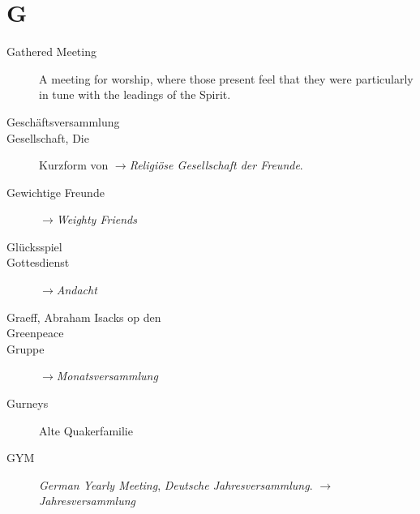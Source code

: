\section*{G}

\articlesize

\begin{description}

\item[Gathered Meeting]
    A meeting for worship, where those present feel that they were particularly in tune with the leadings of the Spirit.

 \item[Geschäftsversammlung]

 \item[Gesellschaft, Die] Kurzform von $\to$\textit{Religiöse Gesellschaft der Freunde}.

\item[Gewichtige Freunde] $\to$\textit{Weighty Friends}

\item[Glücksspiel]

\item[Gottesdienst] $\to$\textit{Andacht}

 \item[Graeff, Abraham Isacks op den]

 \item[Greenpeace]

\item[Gruppe] $\to$\textit{Monatsversammlung}

\item[Gurneys] Alte Quakerfamilie

\item[GYM] \textit{German Yearly Meeting}, \textit{Deutsche Jahresversammlung}. $\to$\textit{Jahresversammlung}
 \end{description}

\normalsize